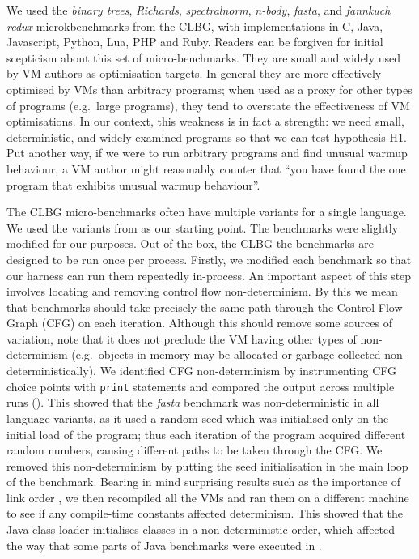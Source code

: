 \documentclass[10pt,preprint]{sigplanconf}
\newcommand{\hypone}{H1\xspace}
\newcommand{\binarytrees}{\emph{binary trees}\xspace}
\newcommand{\richards}{\emph{Richards}\xspace}
\newcommand{\spectralnorm}{\emph{spectralnorm}\xspace}
\newcommand{\nbody}{\emph{n-body}\xspace}
\newcommand{\fasta}{\emph{fasta}\xspace}
\newcommand{\fannkuch}{\emph{fannkuch redux}\xspace}
\begin{document}
We used the \binarytrees, \richards, \spectralnorm, \nbody, \fasta, and
\fannkuch microkbenchmarks from the CLBG, with implementations in C, Java,
Javascript, Python, Lua, PHP and Ruby. Readers can be forgiven for initial scepticism
about this set of micro-benchmarks. They are small and widely
used by VM authors as optimisation targets. In general they are more effectively
optimised by VMs than arbitrary programs; when used as a proxy for other types
of programs (e.g.~large programs), they tend to overstate the effectiveness of
VM optimisations. In our context, this weakness is in fact a strength: we need
small, deterministic, and widely examined programs so that we can test
hypothesis \hypone. Put another way, if we were to run arbitrary programs
and find unusual warmup behaviour, a VM author might reasonably counter that
``you have found the one program that exhibits unusual warmup behaviour''.

The CLBG micro-benchmarks often have multiple variants for a single language.
We used the variants from \cite{bolz14impact} as our starting point. The
benchmarks were slightly modified for our purposes. Out of the box, the
CLBG the benchmarks are designed to be run once per process. Firstly, we
modified each benchmark so that our harness can run them repeatedly in-process.
An important aspect of this step involves locating and removing control flow
non-determinism. By this we mean that benchmarks should take precisely the same
path through the Control Flow Graph (CFG) on each iteration. Although this
should remove some sources of variation, note that it does not preclude the VM
having other types of non-determinism (e.g.~objects in memory may be allocated
or garbage collected non-deterministically). We identified CFG non-determinism
by instrumenting CFG choice points with \texttt{print} statements and compared
the output across multiple runs (). This showed that the \fasta
benchmark was non-deterministic in all language variants, as it used a random
seed which was
initialised only on the initial load of the program; thus each iteration of the
program acquired different random numbers, causing different paths to be taken
through the CFG. We removed this non-determinism by putting the seed
initialisation in the main loop of the benchmark. Bearing in mind surprising
results such as the importance of link order \cite{mytkowicz09surprising}, we
then recompiled all the VMs and ran them on a different machine to see if any
compile-time constants affected determinism.  This showed that the Java class loader
initialises classes in a non-deterministic order, which affected the way that
some parts of Java benchmarks were executed in  .
\end{document}
